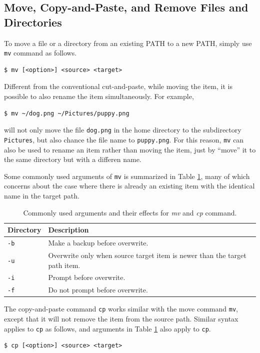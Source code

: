\subsection{Move, Copy-and-Paste, and Remove Files and Directories}

To move a file or a directory from an existing PATH to a new PATH, simply use \verb|mv| command as follows.
\begin{lstlisting}
$ mv [<option>] <source> <target>
\end{lstlisting}
Different from the conventional cut-and-paste, while moving the item, it is possible to also rename the item simultaneously. For example,
\begin{lstlisting}
$ mv ~/dog.png ~/Pictures/puppy.png
\end{lstlisting}
will not only move the file \verb|dog.png| in the home directory to the subdirectory \verb|Pictures|, but also chance the file name to \verb|puppy.png|. For this reason, \verb|mv| can also be used to rename an item rather than moving the item, just by ``move'' it to the same directory but with a differen name.

Some commonly used arguments of \verb|mv| is summarized in Table \ref{ch:fm:tab:mvcpcommandargument}, many of which concerns about the case where there is already an existing item with the identical name in the target path.

\begin{table}
  \centering \caption{Commonly used arguments and their effects for \textit{mv} and \textit{cp} command.}\label{ch:fm:tab:mvcpcommandargument}
  \begin{tabularx}{\textwidth}{lX}
    \hline
    Directory & Description \\ \hline
    \verb|-b| & Make a backup before overwrite. \\ 
    \verb|-u| & Overwrite only when source target item is newer than the target path item. \\ 
    \verb|-i| & Prompt before overwrite. \\ 
    \verb|-f| & Do not prompt before overwrite. \\
    \hline
  \end{tabularx}
\end{table}

The copy-and-paste command \verb|cp| works similar with the move command \verb|mv|, except that it will not remove the item from the source path. Similar syntax applies to \verb|cp| as follows, and arguments in Table \ref{ch:fm:tab:mvcpcommandargument} also apply to \verb|cp|.
\begin{lstlisting}
$ cp [<option>] <source> <target>
\end{lstlisting}

